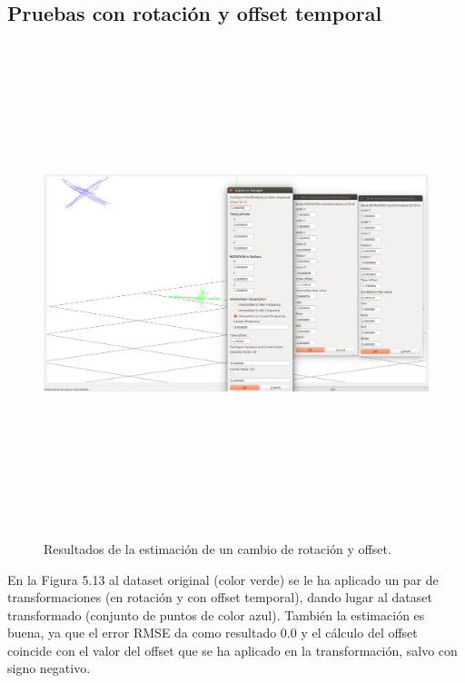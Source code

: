\subsection{Pruebas con rotación y offset temporal}
\begin{figure}[H]
\begin{center}
\label{fig:opciones de View}\includegraphics[height=14.0cm,width=18.0cm]{img/cap6/Rota_Offset_abba.png}
\hspace{0.5cm}

\end{center}

\caption{Resultados de la estimación de un cambio de rotación y offset.}
\end{figure}

En la Figura 5.13 al dataset original (color verde) se le ha aplicado un par de transformaciones (en rotación y con offset temporal), dando lugar al dataset transformado (conjunto de puntos de color azul). También la estimación es buena, ya que el error RMSE da como resultado 0.0 y el cálculo del offset coincide con el valor del offset que se ha aplicado en la transformación, salvo con signo negativo.



